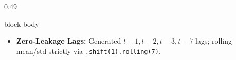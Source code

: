 \documentclass[aspectratio=169, 10pt]{beamer}
\newenvironment{card}[1][]{%
        \begin{beamercolorbox}[rounded=true,shadow=false,wd=\linewidth,sep=3.5pt,#1]{block body}%
        \fontsize{7.8pt}{9.8pt}\selectfont%
    }{%
        \end{beamercolorbox}%
    }
\begin{document}
\begin{frame}[t]
\begin{columns}[T]
\begin{column}{0.49\textwidth}
\begin{card}
\begin{itemize}
                        \item \textbf{Zero-Leakage Lags:} Generated $t-1, t-2, t-3, t-7$ lags; rolling mean/std strictly via \texttt{.shift(1).rolling(7)}.                                            
                    \end{itemize}                                                                                                                                                                      
                \end{card}                                                                                                                                                                             
            \end{column}                                                                                                                                                                               
                                                                                                                                                                                                       

\end{columns}
\end{frame}
\end{document}
